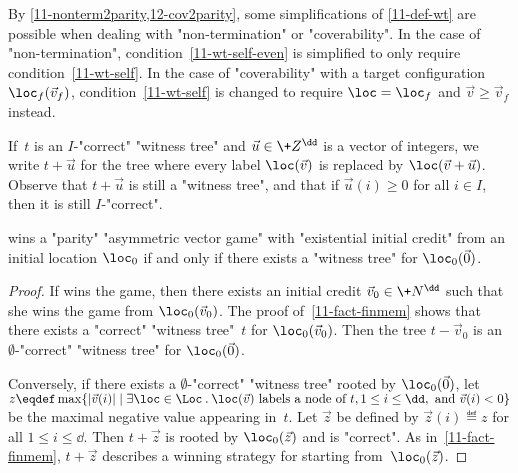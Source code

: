 \begin{remark}\label{11-rk-wt}
  By \cref{11-nonterm2parity,12-cov2parity}, some simplifications of
  \cref{11-def-wt} are possible when dealing with "non-termination" or
  "coverability". In the case of "non-termination",
  condition~\cref{11-wt-self-even} is simplified to only require
  condition~\cref{11-wt-self}.  In the case of "coverability" with a
  target configuration $\loc_f(\vec v_f)$, condition~\cref{11-wt-self}
  is changed to require $\loc=\loc_f$ and $\vec v\geq\vec v_f$
  instead.
\end{remark}

If~$t$ is an $I$-"correct" "witness tree" and $\vec u\in\+Z^\dd$ is a
vector of integers, we write $t+\vec u$ for the tree where
every label $\loc(\vec v)$ is replaced by $\loc(\vec v+\vec u)$.
Observe that $t+\vec u$ is still a "witness tree", and that if $\vec
u(i)\geq 0$ for all $i\in I$, then it is still $I$-"correct".

\begin{lemma}\label{11-lem-wt}
  \Eve wins a "parity" "asymmetric vector game" with "existential
  initial credit" from an initial location $\loc_0$ if and only if
  there exists a "witness tree" for $\loc_0(\vec 0)$.
\end{lemma}
\begin{proof}
  If \Eve wins the game, then there exists an initial credit
  $\vec v_0\in\+N^\dd$ such that she wins the game from
  $\loc_0(\vec v_0)$.  The proof of~\cref{11-fact-finmem} shows that
  there exists a "correct" "witness tree"~$t$ for $\loc_0(\vec v_0)$.
  Then the tree $t-\vec v_0$ is an $\emptyset$-"correct" "witness
  tree" for $\loc_0(\vec 0)$.

  Conversely, if there exists a $\emptyset$-"correct" "witness tree"
  rooted by $\loc_0(\vec 0)$, let
  $z\eqdef\max\{|\vec v(i)|\mid \exists\loc\in\Loc\mathbin.\loc(\vec
  v)\text{ labels a node of }t,1\leq i\leq \dd,\text{ and }\vec v(i)<0\}$
  be the maximal negative value appearing in~$t$.  Let $\vec z$ be
  defined by $\vec z(i)\eqdef z$ for all $1\leq i\leq\dd$.  Then
  $t+\vec z$ is rooted by $\loc_0(\vec z)$ and is "correct".  As
  in~\cref{11-fact-finmem}, $t+\vec z$ describes a winning strategy
  for \Eve starting from~$\loc_0(\vec z)$.
\end{proof}


